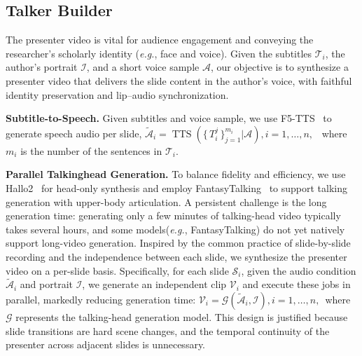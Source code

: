 \subsection{Talker Builder}
\vspace{-0.5\baselineskip} 
The presenter video is vital for audience engagement and conveying the researcher’s scholarly identity (\textit{e.g.}, face and voice). Given the subtitles $\mathcal{T}_i$, the author’s portrait $\mathcal{I}$, and a short voice sample $\mathcal{A}$, our objective is to synthesize a presenter video that delivers the slide content in the author’s voice, with faithful identity preservation and lip–audio synchronization.

\vspace{-0.4\baselineskip}
\noindent\textbf{Subtitle-to-Speech.} Given subtitles and voice sample, we use F5-TTS~\cite{tts-f5} to generate speech audio per slide, \begingroup \small $
\widetilde{\mathcal{A}}_i = \operatorname{TTS}\!\left( \{\, T_{i}^{j} \,\}_{j=1}^{m_i} |\mathcal{A}\right), i=1,\ldots,n, $
\endgroup ~where $m_i$ is the number of the sentences in $\mathcal{T}_i$.

\vspace{-0.4\baselineskip}
\noindent\textbf{Parallel Talkinghead Generation.} 
To balance fidelity and efficiency, we use Hallo2~\cite{cui2024hallo2} for head-only synthesis and employ FantasyTalking~\cite{fantasytalking} to support talking generation with upper-body articulation.
A persistent challenge is the long generation time: generating only a few minutes of talking-head video typically takes several hours, and some models(\textit{e.g.}, FantasyTalking) do not yet natively support long-video generation. 
Inspired by the common practice of slide-by-slide recording and the independence between each slide, we synthesize the presenter video on a per-slide basis. Specifically, for each slide $\mathcal{S}_i$, given the audio condition $\widetilde{\mathcal{A}}_i$ and portrait $\mathcal{I}$, we generate an independent clip $\mathcal{V}_i$ and execute these jobs in parallel, markedly reducing generation time: \begingroup \small $\mathcal{V}_i = \mathcal{G}\!\left(\widetilde{\mathcal{A}}_i, \mathcal{I}\right), i=1,\ldots,n,$\endgroup ~where $\mathcal{G}$ represents the talking-head generation model.
This design is justified because slide transitions are hard scene changes, and the temporal continuity of the presenter across adjacent slides is unnecessary.

